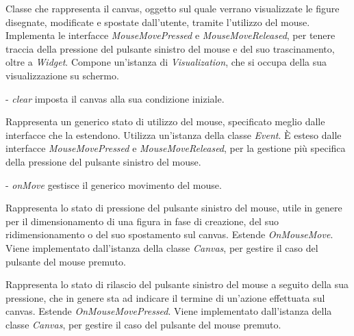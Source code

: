 Classe che rappresenta il canvas, oggetto sul quale verrano visualizzate le figure disegnate, modificate e spostate dall'utente, tramite l'utilizzo del mouse. 
Implementa le interfacce \textit{MouseMovePressed} e \textit{MouseMoveReleased}, per tenere traccia della pressione del pulsante sinistro del mouse e del suo trascinamento, oltre a \textit{Widget}.
Compone un'istanza di \textit{Visualization}, che si occupa della sua visualizzazione su schermo.
\begin{elencopuntato}[\normindent]
\item[-]  \textit{clear} imposta il canvas alla sua condizione iniziale.
\end{elencopuntato}

Rappresenta un generico stato di utilizzo del mouse, specificato meglio dalle interfacce che la estendono.
Utilizza un'istanza della classe \textit{Event}.
\` E esteso dalle interfacce \textit{MouseMovePressed} e \textit{MouseMoveReleased}, per la gestione pi\` u specifica della pressione del pulsante sinistro del mouse.
\begin{elencopuntato}[\normindent]
\item[-]  \textit{onMove} gestisce il generico movimento del mouse.
\end{elencopuntato}

Rappresenta lo stato di pressione del pulsante sinistro del mouse, utile in genere per il dimensionamento di una figura in fase di creazione, del suo ridimensionamento o del suo spostamento sul canvas. 
Estende \textit{OnMouseMove}.
Viene implementato dall'istanza della classe \textit{Canvas}, per gestire il caso del pulsante del mouse premuto.

Rappresenta lo stato di rilascio del pulsante sinistro del mouse a seguito della sua pressione, che in genere sta ad indicare il termine di un'azione effettuata sul canvas.
Estende \textit{OnMouseMovePressed}.
Viene implementato dall'istanza della classe \textit{Canvas}, per gestire il caso del pulsante del mouse premuto.

